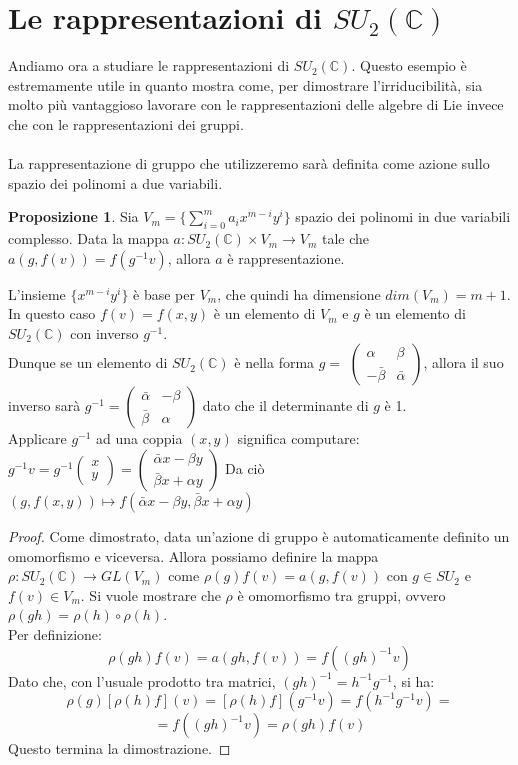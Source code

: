 \documentclass[12pt,a4paper]{report}
\theoremstyle{definition}
\theoremstyle{Theorem}
\newtheorem{Prop}[Def]{Proposizione}
\theoremstyle{definition}
\theoremstyle{definition}
\theoremstyle{definition}
\begin{document}
\section{Le rappresentazioni di $SU_2(\mathbb{C})$}
Andiamo ora a studiare le rappresentazioni di $SU_2(\mathbb{C})$. Questo esempio è estremamente utile in quanto mostra come, per dimostrare l'irriducibilità, sia molto più vantaggioso lavorare con le rappresentazioni delle algebre di Lie invece che con le rappresentazioni dei gruppi.\\
\\
La rappresentazione di gruppo che utilizzeremo sarà definita come azione sullo spazio dei polinomi a due variabili.
\begin{Prop}
	Sia $V_m=\{\sum_{i=0}^{m} a_ix^{m-i}y^i\}$ spazio dei polinomi in due variabili complesso. Data la mappa $a:SU_2(\mathbb{C})\times V_m\rightarrow V_m$ tale che $a(g,f(v))=f(g^{-1}v)$, allora $a$ è rappresentazione.
\end{Prop}
L'insieme $\{x^{m-i}y^i\}$ è base per $V_m$, che quindi ha dimensione $dim(V_m)=m+1$.\\
In questo caso $f(v)=f(x,y)$ è un elemento di $V_m$ e $g$ è un elemento di $SU_2(\mathbb{C})$ con inverso $g^{-1}$.\\
Dunque se un elemento di $SU_2(\mathbb{C})$ è nella forma $g=$
$\begin{pmatrix}
	\alpha&\beta\\
	-\bar{\beta}&\bar{\alpha}
\end{pmatrix}$,
allora il suo inverso sarà $g^{-1}=
\begin{pmatrix}
	\bar{\alpha}&-\beta\\
	\bar{\beta}&\alpha
\end{pmatrix}$ dato che il determinante di $g$ è 1. \\
Applicare $g^{-1}$ ad una coppia $(x,y)$ significa computare:
$g^{-1}v=g^{-1}
\begin{pmatrix}
	x\\y
\end{pmatrix}=
\begin{pmatrix}
	\bar{\alpha}x-\beta y\\
	\bar{\beta}x+\alpha y
\end{pmatrix}$
Da ciò $(g,f(x,y))\longmapsto f(\bar{\alpha}x-\beta y,\bar{\beta}x+\alpha y)$
\begin{proof}
	Come dimostrato, data un'azione di gruppo è automaticamente definito un omomorfismo e viceversa. Allora possiamo definire la mappa $\rho:SU_2(\mathbb{C})\rightarrow GL(V_m)$ come $\rho(g)f(v)=a(g,f(v))$ con $g\in SU_2$ e $f(v)\in V_m$.
	Si vuole mostrare che $\rho$ è omomorfismo tra gruppi, ovvero $\rho(gh)=\rho(h)\circ\rho(h)$.\\
	Per definizione:
	$$\rho(gh)f(v)=a(gh,f(v))=f((gh)^{-1}v)$$
	Dato che, con l'usuale prodotto tra matrici, $(gh)^{-1}=h^{-1}g^{-1}$, si ha:
	$$\rho(g)[\rho(h)f](v)=[\rho(h)f](g^{-1}v)=f(h^{-1}g^{-1}v)=$$
	$$=f((gh)^{-1}v)=\rho(gh)f(v)$$
	Questo termina la dimostrazione.
\end{proof}
\end{document}
